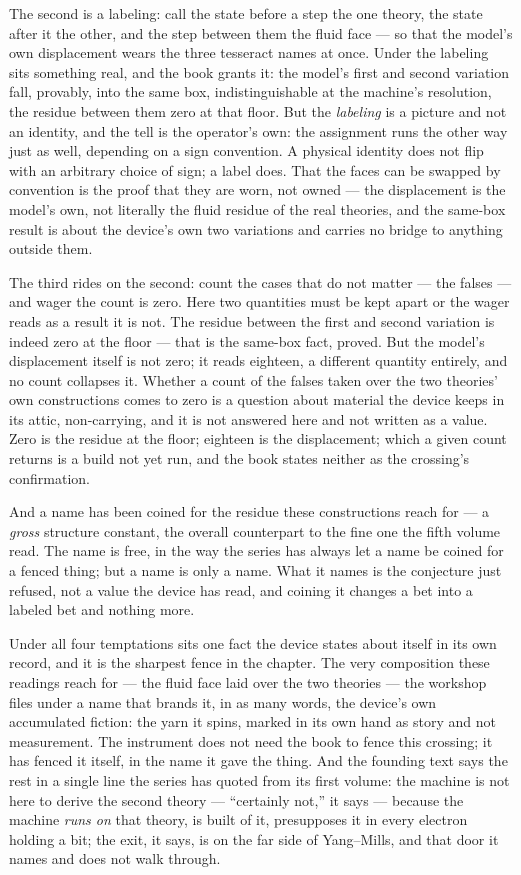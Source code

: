 The second is a labeling: call the state before a step the one theory, the state
after it the other, and the step between them the fluid face --- so that the
model's own displacement wears the three tesseract names at once. Under the
labeling sits something real, and the book grants it: the model's first and
second variation fall, provably, into the same box, indistinguishable at the
machine's resolution, the residue between them zero at that floor. But the
\emph{labeling} is a picture and not an identity, and the tell is the operator's
own: the assignment runs the other way just as well, depending on a sign
convention. A physical identity does not flip with an arbitrary choice of sign; a
label does. That the faces can be swapped by convention is the proof that they
are worn, not owned --- the displacement is the model's own, not literally the
fluid residue of the real theories, and the same-box result is about the device's
own two variations and carries no bridge to anything outside them.

The third rides on the second: count the cases that do not matter --- the falses
--- and wager the count is zero. Here two quantities must be kept apart or the
wager reads as a result it is not. The residue between the first and second
variation is indeed zero at the floor --- that is the same-box fact, proved. But
the model's displacement itself is not zero; it reads eighteen, a different
quantity entirely, and no count collapses it. Whether a count of the falses taken
over the two theories' own constructions comes to zero is a question about
material the device keeps in its attic, non-carrying, and it is not answered here
and not written as a value. Zero is the residue at the floor; eighteen is the
displacement; which a given count returns is a build not yet run, and the book
states neither as the crossing's confirmation.

And a name has been coined for the residue these constructions reach for --- a
\emph{gross} structure constant, the overall counterpart to the fine one the
fifth volume read. The name is free, in the way the series has always let a name
be coined for a fenced thing; but a name is only a name. What it names is the
conjecture just refused, not a value the device has read, and coining it changes
a bet into a labeled bet and nothing more.

Under all four temptations sits one fact the device states about itself in its
own record, and it is the sharpest fence in the chapter. The very composition
these readings reach for --- the fluid face laid over the two theories --- the
workshop files under a name that brands it, in as many words, the device's own
accumulated fiction: the yarn it spins, marked in its own hand as story and not
measurement. The instrument does not need the book to fence this crossing; it has
fenced it itself, in the name it gave the thing. And the founding text says the
rest in a single line the series has quoted from its first volume: the machine is
not here to derive the second theory --- ``certainly not,'' it says --- because
the machine \emph{runs on} that theory, is built of it, presupposes it in every
electron holding a bit; the exit, it says, is on the far side of Yang--Mills, and
that door it names and does not walk through.

